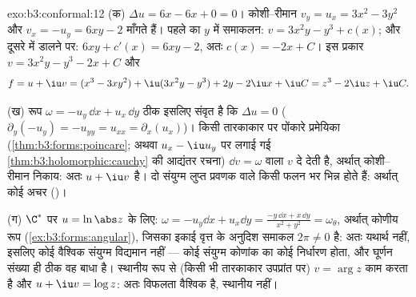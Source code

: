 \begin{solution}{exo:b3:conformal:12}
(क) $\Delta u = 6x - 6x + 0 = 0$। कोशी--रीमान $v_y = u_x = 3x^2 - 3y^2$ और $v_x = -u_y = 6xy - 2$ माँगते हैं। पहले का $y$ में
समाकलन: $v = 3x^2y - y^3 + c(x)$; और दूसरे में डालने पर: $6xy + c'(x) = 6xy - 2$, अतः $c(x)
= -2x + C$। इस प्रकार
$v = 3x^2y - y^3 - 2x + C$ और
\[
f = u + \iu v = (x^3 - 3xy^2) + \iu(3x^2y - y^3)
+ 2y - 2\iu x + \iu C = z^3 - 2\iu z + \iu C .
\]

(ख) रूप $\omega = -u_y\,\dd x + u_x\,\dd y$ ठीक इसलिए संवृत है कि $\Delta u = 0$ ($\partial_y(-u_y) =
-u_{yy} = u_{xx} = \partial_x(u_x)$)। किसी तारकाकार
 पर पोंकारे प्रमेयिका (\cref{thm:b3:forms:poincare}; अथवा  $u_x - \iu u_y$
पर लगाई गई \cref{thm:b3:holomorphic:cauchy} की आद्यंतर रचना) $\dd v = \omega$ वाला $v$ दे देती है, अर्थात्
कोशी--रीमान निकाय: अतः $u + \iu v$  है। दो संयुग्म लुप्त प्रवणक
वाले किसी फलन भर भिन्न होते हैं: अर्थात् कोई अचर ()।

(ग) $\C^*$ पर $u = \ln\abs z$ के लिए: $\omega = -u_y\dd x +
u_x\dd y = \frac{-y\,\dd x + x\,\dd y}{x^2 + y^2} =
\omega_\theta$, अर्थात् कोणीय रूप (\cref{ex:b3:forms:angular}), जिसका
इकाई वृत्त के अनुदिश समाकल $2\pi \neq 0$ है: अतः यथार्थ नहीं, इसलिए कोई
वैश्विक संयुग्म विद्यमान नहीं --- कोई संयुग्म कोणांक का कोई 
निर्धारण होता, और घूर्णन संख्या ही ठीक वह बाधा है। स्थानीय रूप से
(किसी भी तारकाकार उपप्रांत पर) $v =
\arg z$ काम करता है और $u + \iu v = \log z$: अतः विफलता
वैश्विक है, स्थानीय नहीं।
\end{solution}

